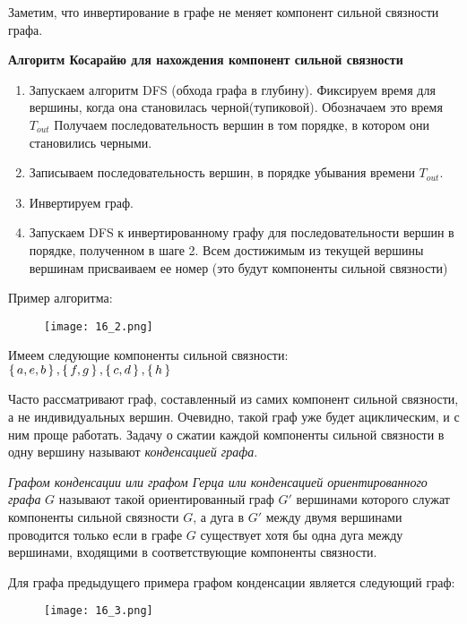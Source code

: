 Заметим, что инвертирование в графе не меняет компонент сильной связности
графа.

\textbf{Алгоритм Косарайю для нахождения компонент сильной связности}
\begin{enumerate}[left=0.0em, labelsep=1em, topsep=0.0em, itemsep=0pt, parsep=0.5em]
    \item Запускаем алгоритм DFS (обхода графа в глубину). Фиксируем время
    для вершины, когда она становилась черной(тупиковой). Обозначаем это
    время $T_{out}$ Получаем последовательность вершин в том порядке, в котором они
    становились черными.
    \item Записываем последовательность вершин, в порядке убывания времени
    $T_{out}$.
    \item Инвертируем граф.
    \item Запускаем DFS к инвертированному графу для последовательности
    вершин в порядке, полученном в шаге 2. Всем достижимым из текущей
    вершины вершинам присваиваем ее номер (это будут компоненты сильной
    связности)
\end{enumerate}

Пример алгоритма:
\begin{figure}[h]
    \centering
    \texttt{[image: 16\_2.png]}
\end{figure}

Имеем следующие компоненты сильной связности: \\
$\set{a,e,b},\set{f,g},\set{c,d},\set{h}$

\newpage
Часто рассматривают граф, составленный из самих компонент сильной
связности, а не индивидуальных вершин. Очевидно, такой граф уже будет
ациклическим, и с ним проще работать. Задачу о сжатии каждой компоненты
сильной связности в одну вершину называют \textit{конденсацией графа}.

\textit{Графом конденсации или графом Герца или конденсацией ориентированного
графа} $G$ называют такой ориентированный граф ${G}'$ вершинами которого
служат компоненты сильной связности $G$, а дуга в ${G}'$ между двумя вершинами
проводится только если в графе $G$ существует хотя бы одна дуга между
вершинами, входящими в соответствующие компоненты связности.

Для графа предыдущего примера графом конденсации является следующий граф:
\begin{figure}[h]
    \centering
    \texttt{[image: 16\_3.png]}
\end{figure}